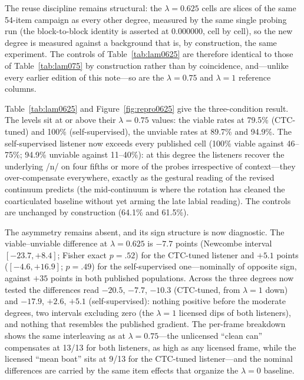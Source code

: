 \documentclass[11pt,a4paper]{article}
\newcommand{\lam}{\lambda}
\begin{document}
The reuse discipline remains structural: the $\lam=0.625$ cells are
slices of the same 54-item campaign as every other degree, measured by
the same single probing run (the block-to-block identity is asserted
at 0.000000, cell by cell), so the new degree is measured against a
background that is, by construction, the same experiment. The
controls of Table~\ref{tab:lam0625} are therefore identical to those
of Table~\ref{tab:lam075} by construction rather than by coincidence,
and---unlike every earlier edition of this note---so are the
$\lam=0.75$ and $\lam=1$ reference columns.

Table~\ref{tab:lam0625} and Figure~\ref{fig:repro0625} give the
three-condition result. The levels sit at or above their $\lam=0.75$
values: the viable rates at 79.5\% (CTC-tuned) and 100\%
(self-supervised), the unviable rates at 89.7\% and 94.9\%. The
self-supervised listener now exceeds every published cell (100\%
viable against 46--75\%; 94.9\% unviable against 11--40\%): at this
degree the listeners recover the underlying /n/ on four fifths or
more of the probes irrespective of context---they over-compensate
everywhere, exactly as the gestural reading of the revised continuum
predicts (the mid-continuum is where the rotation has cleaned the
coarticulated baseline without yet arming the late labial reading).
The controls are unchanged by construction (64.1\% and 61.5\%).

The asymmetry remains absent, and its sign structure is now
diagnostic. The viable--unviable difference at $\lam=0.625$ is
$-7.7$ points (Newcombe interval $[-23.7, +8.4]$; Fisher exact
$p = .52$) for the CTC-tuned listener and $+5.1$ points
($[-4.6, +16.9]$; $p = .49$) for the self-supervised one---nominally
of opposite sign, against $+35$ points in both published populations.
Across the three degrees now tested the differences read $-20.5$,
$-7.7$, $-10.3$ (CTC-tuned, from $\lam=1$ down) and $-17.9$, $+2.6$,
$+5.1$ (self-supervised): nothing positive before the moderate
degrees, two intervals excluding zero (the $\lam=1$ licensed dips of
both listeners), and nothing that resembles the published gradient. The per-frame breakdown shows the same
interleaving as at $\lam=0.75$---the unlicensed ``clean can''
compensates at 13/13 for both listeners, as high as any licensed
frame, while the licensed ``mean boat'' sits at 9/13 for the
CTC-tuned listener---and the nominal differences are carried by the
same item effects that organize the $\lam=0$ baseline.
\end{document}
